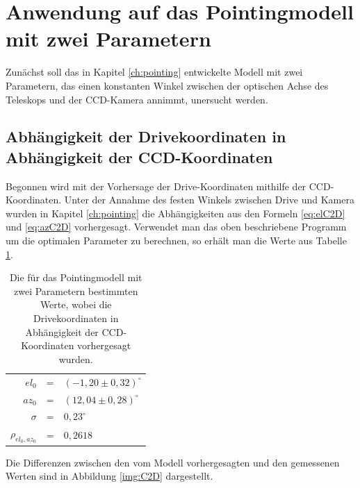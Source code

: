 \section{Anwendung auf das Pointingmodell mit zwei Parametern}
Zunächst soll das in Kapitel \ref{ch:pointing} entwickelte Modell mit zwei Parametern, das einen konstanten Winkel zwischen der optischen Achse des Teleskops und der CCD-Kamera annimmt, unersucht werden.
\subsection{Abhängigkeit der Drivekoordinaten in Abhängigkeit der CCD-Koordinaten}
Begonnen wird mit der Vorhersage der Drive-Koordinaten mithilfe der CCD-Koordinaten. Unter der Annahme des festen Winkels zwischen Drive und Kamera wurden in Kapitel \ref{ch:pointing} die Abhängigkeiten aus den Formeln \ref{eq:elC2D} und \ref{eq:azC2D} vorhergesagt. Verwendet man das oben beschriebene Programm um die optimalen Parameter zu berechnen, so erhält man die Werte aus Tabelle \ref{tab:C2D}.
\begin{table}[htbp]
\centering
\begin{tabular}{rcl}
\toprule
$el_0$ &=& $(-1,20\pm0,32)^{\circ}$\\
$az_0$ &=& $(12,04\pm0,28)^{\circ}$\\
$\sigma$ &=& $0,23^{\circ}$\\
$\rho_{el_0,az_0}$ &=& $0,2618$\\
\bottomrule
\end{tabular}
\label{tab:C2D}
\caption{Die für das Pointingmodell mit zwei Parametern bestimmten Werte, wobei die Drivekoordinaten in Abhängigkeit der CCD-Koordinaten vorhergesagt wurden.}
\end{table}
Die Differenzen zwischen den vom Modell vorhergesagten und den gemessenen Werten sind in Abbildung \ref{img:C2D} dargestellt.

